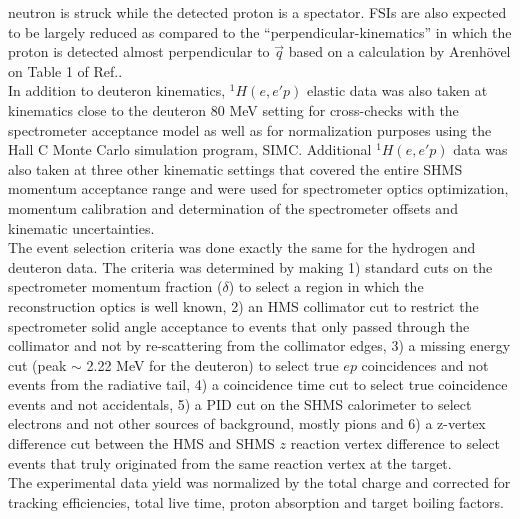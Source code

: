 neutron is struck while the detected proton is a spectator. FSIs are also expected to be largely reduced as compared to the ``perpendicular-kinematics'' in which the
proton is detected almost perpendicular to $\vec{q}$ based on a calculation by Arenh\"{o}vel on Table 1 of Ref.\cite{pr01-020}.\\
\indent In addition to deuteron kinematics,  $^{1}H(e,e'p)$ elastic data was also taken at kinematics close to the deuteron 80 MeV setting for cross-checks with the spectrometer acceptance model as well as for normalization purposes using the  Hall C Monte Carlo
simulation program, SIMC. Additional $^{1}H(e,e'p)$ data was also taken at three other kinematic settings that covered the entire SHMS momentum acceptance range and were used for spectrometer optics optimization, 
momentum calibration and determination of the spectrometer offsets and kinematic uncertainties\cite{cyero_specKinUnc,cyero_SHMSOptics}. \\
\indent The event selection criteria was done exactly the same for the hydrogen and deuteron data. The criteria was determined by making 1) standard cuts on the spectrometer momentum fraction ($\delta$) to select a region in which the reconstruction optics
is well known, 2) an HMS collimator cut to restrict the spectrometer solid angle acceptance to events that only passed through the collimator and not by re-scattering from the collimator edges, 3) a missing
energy cut (peak $\sim$ 2.22 MeV for the deuteron) to select true $ep$ coincidences and not events from the radiative tail, 4) a coincidence time cut to select true coincidence events and not accidentals,  5) a PID cut on the
SHMS calorimeter to select electrons and not other sources of background, mostly pions and 6) a z-vertex difference cut between the HMS and SHMS $z$ reaction vertex difference to select events that truly
originated from the same reaction vertex at the target. \\
\indent The experimental data yield was normalized by the total charge and corrected for tracking efficiencies, total live time, proton absorption\cite{cyero_pAbs} and target boiling factors\cite{cyero_tgtBoil}.
